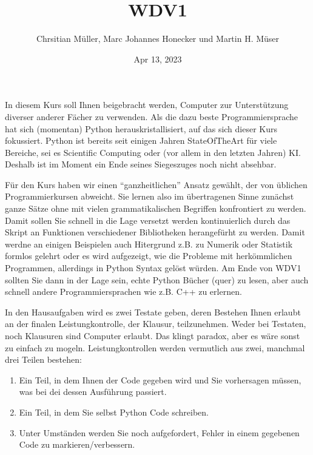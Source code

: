 \documentclass[letterpaper,10pt,english]{jupyterBook}
\title{WDV1}
\date{Apr 13, 2023}
\author{Chrsitian Müller, Marc Johannes Honecker und Martin H.\@{} Müser}
\begin{document}
\pagestyle{empty}
\sphinxmaketitle
\pagestyle{plain}
\sphinxtableofcontents
\pagestyle{normal}
\label{\detokenize{intro::doc}}


\sphinxAtStartPar
In diesem Kurs soll Ihnen beigebracht werden, Computer zur Unterstützung diverser anderer Fächer zu verwenden. Als die dazu beste
Programmiersprache hat sich (momentan) Python herauskristallisiert, auf das sich dieser Kurs fokussiert. Python ist bereits seit
einigen Jahren State\sphinxhyphen{}Of\sphinxhyphen{}The\sphinxhyphen{}Art für viele Bereiche, sei es Scientific Computing oder (vor allem in den letzten Jahren) KI.
Deshalb ist im Moment ein Ende seines Siegeszuges noch nicht absehbar.

\sphinxAtStartPar
Für den Kurs haben wir einen “ganzheitlichen” Ansatz gewählt, der von üblichen Programmierkursen abweicht. Sie lernen also im
übertragenen Sinne zunächst ganze Sätze ohne mit vielen grammatikalischen Begriffen konfrontiert zu werden. Damit sollen Sie
schnell in die Lage versetzt werden kontinuierlich durch das Skript an Funktionen verschiedener Bibliotheken herangefürht zu
werden. Damit werdne an einigen Beispielen auch Hitergrund z.B. zu Numerik oder Statistik formlos gelehrt oder es wird aufgezeigt,
wie die Probleme mit herkömmlichen Programmen, allerdings in Python Syntax gelöst würden. Am Ende von WDV\sphinxhyphen{}1 sollten Sie dann in
der Lage sein, echte Python Bücher (quer) zu lesen, aber auch schnell andere Programmiersprachen wie z.B. C++ zu erlernen.

\sphinxAtStartPar
In den Hausaufgaben wird es zwei Testate geben, deren Bestehen Ihnen erlaubt an der finalen Leistungkontrolle, der Klausur,
teilzunehmen. Weder bei Testaten, noch Klausuren sind Computer erlaubt. Das klingt paradox, aber es wäre sonst zu einfach zu
mogeln. Leistungkontrollen werden vermutlich aus zwei, manchmal drei Teilen bestehen:
\begin{enumerate}
%
\item {} 
\sphinxAtStartPar
Ein Teil, in dem Ihnen der Code gegeben wird und Sie vorhersagen müssen, was bei dei dessen Ausführung passiert.

\item {} 
\sphinxAtStartPar
Ein Teil, in dem Sie selbst Python Code schreiben.

\item {} 
\sphinxAtStartPar
Unter Umständen werden Sie noch aufgefordert, Fehler in einem gegebenen Code zu markieren/verbessern.

\end{enumerate}
\end{document}
